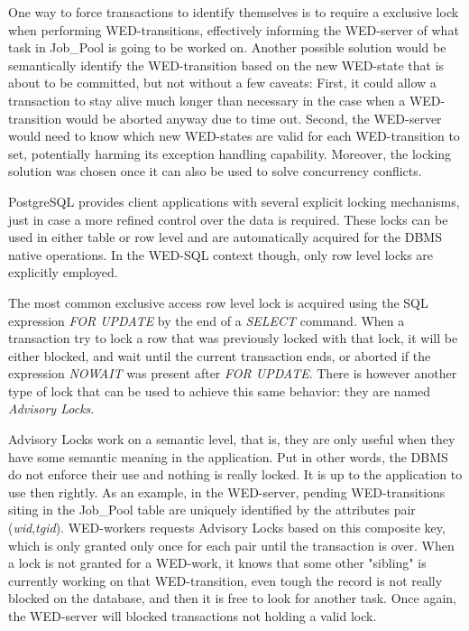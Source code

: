 \documentclass[conference]{IEEEtran}
\begin{document}
\par One way to force transactions to identify themselves is to require a exclusive lock when performing WED-transitions,
effectively informing the WED-server of what task in Job\_Pool is going to be worked on. Another possible solution would
be semantically identify the WED-transition based on the new WED-state that is about to be committed, but not without a 
few caveats: First, it could allow a transaction to stay alive much longer than necessary in the case when a WED-transition
would be aborted anyway due to time out. Second, the WED-server would need to know which new WED-states are valid for each
WED-transition to set, potentially harming its exception handling capability. Moreover, the locking solution was chosen 
once it can also be used to solve concurrency conflicts.    

\par PostgreSQL provides client applications with several explicit locking mechanisms, just in case a more refined control
over the data is required. These locks can be used in either table or row level and are automatically acquired for the DBMS
native operations. In the WED-SQL context though, only row level locks are explicitly employed.  

\par The most common exclusive access row level lock is acquired using the SQL expression \emph{FOR UPDATE} by the end of
a \emph{SELECT} command. When a transaction try to lock a row that was previously locked with that lock, it will be either blocked,
and wait until the current transaction ends, or aborted if the expression \emph{NOWAIT} was present after \emph{FOR UPDATE}.
There is however another type of lock that can be used to achieve this same behavior: they are named \emph{Advisory Locks}.

\par Advisory Locks work on a semantic level, that is, they are only useful when they have some semantic meaning in the 
application. Put in other words, the DBMS do not enforce their use and nothing is really locked. It is up to the application
to use then rightly. As an example, in the WED-server, pending WED-transitions siting in the Job\_Pool table are uniquely
identified by the attributes pair (\emph{wid},\emph{tgid}). WED-workers requests Advisory Locks based on this composite key, 
which is only granted only once for each pair until the transaction is over. When a lock is not granted for a WED-work, it
knows that some other "sibling" is currently working on that WED-transition, even tough the record is not really blocked
on the database, and then it is free to look for another task. Once again, the WED-server will blocked transactions not
holding a valid lock. 
 
\end{document}
